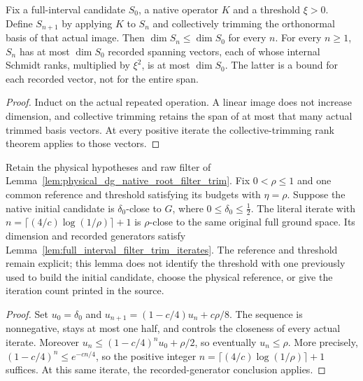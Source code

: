 \begin{lemma}
    \label{lem:full_interval_filter_trim_iterates}
    \leanok
    Fix a full-interval candidate $S_0$, a native operator $K$ and a
    threshold $\xi>0$. Define $S_{n+1}$ by applying $K$ to $S_n$ and
    collectively trimming the orthonormal basis of that actual image.
    Then $\dim S_n\le\dim S_0$ for every $n$. For every $n\ge1$,
    $S_n$ has at most $\dim S_0$ recorded spanning vectors, each of whose
    internal Schmidt ranks, multiplied by $\xi^2$, is at most $\dim S_0$.
    The latter is a bound for each recorded vector, not for the entire span.
\end{lemma}
\begin{proof}\leanok
    Induct on the actual repeated operation. A linear image does not
    increase dimension, and collective trimming retains the span of at
    most that many actual trimmed basis vectors. At every positive
    iterate the collective-trimming rank theorem applies to those vectors.
\end{proof}

\begin{lemma}
    \label{lem:physical_dg_finite_filter_trim}
    \leanok
    Retain the physical hypotheses and raw filter of
    Lemma~\ref{lem:physical_dg_native_root_filter_trim}. Fix $0<\rho\le1$
    and one common reference and threshold satisfying its budgets with
    $\eta=\rho$. Suppose the native initial candidate is
    $\delta_0$-close to $G$, where $0\le\delta_0\le\tfrac12$.
    The literal iterate with
    $n=\lceil(4/c)\log(1/\rho)\rceil+1$ is $\rho$-close
    to the same original full ground space. Its dimension and recorded
    generators satisfy Lemma~\ref{lem:full_interval_filter_trim_iterates}.
    The reference and threshold remain explicit; this lemma does not
    identify the threshold with one previously used to build the initial
    candidate, choose the physical reference, or give the iteration
    count printed in the source.
\end{lemma}
\begin{proof}\leanok
    Set $u_0=\delta_0$ and
    $u_{n+1}=(1-c/4)u_n+c\rho/8$. The sequence is nonnegative, stays
    at most one half, and controls the closeness of every actual iterate.
    Moreover $u_n\le(1-c/4)^nu_0+\rho/2$, so eventually $u_n\le\rho$.
    More precisely, $(1-c/4)^n\le e^{-cn/4}$, so the positive integer
    $n=\lceil(4/c)\log(1/\rho)\rceil+1$ suffices. At this same iterate,
    the recorded-generator conclusion applies.
\end{proof}


